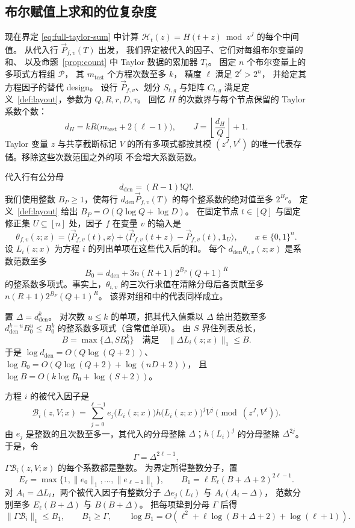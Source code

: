 \documentclass[11pt,reqno]{amsart}
\numberwithin{equation}{section}
\theoremstyle{definition}\newtheorem{definition}[theorem]{定义}
\theoremstyle{remark}\newtheorem{remark}[theorem]{注}
\renewcommand{\le}{\leqslant}
\renewcommand{\ge}{\geqslant}
\begin{document}
\subsection{布尔赋值上求和的位复杂度}
\label{subsec:rational-streaming-height}
现在界定 \eqref{eq:full-taylor-sum} 中计算
$\mathcal H_t(z)=H(t+z)\bmod z^J$ 的每个中间值。
从代入行 $\vec{P}_{f,v}(T)$ 出发，
我们界定被代入的因子、它们对每组布尔变量的和、
以及命题~\ref{prop:count} 中 Taylor 数据的累加器
$T_t$。
固定 $n$ 个布尔变量上的多项式方程组 $\mathcal P$，
其 $m_{\mathrm{test}}$ 个方程次数至多 $k$，
精度 $\ell$ 满足 $2^\ell>2^n$，
并给定其方程因子的替代 design。
设行 $\vec{P}_{f,v}$、划分 $S_{t,g}$ 与矩阵 $C_{t,g}$
满足定义~\ref{def:layout}，参数为 $Q,R,r,D,\tau$。
回忆 $H$ 的次数界与每个节点保留的 Taylor
系数个数：
\[
 d_H=kR\bigl(m_{\mathrm{test}}+2(\ell-1)\bigr),\qquad
 J=\left\lfloor\frac{d_H}{Q}\right\rfloor+1.
\]
Taylor 变量 $z$ 与共享截断标记 $V$
的所有多项式都按其模 $(z^J,V^\ell)$
的唯一代表存储。移除这些次数范围之外的项
不会增大系数范数。

代入行有公分母
\[
 d_{\mathrm{den}}=(R-1)!Q!.
\]
我们使用整数 $B_P\ge1$，使每行
$d_{\mathrm{den}}\vec{P}_{f,v}(T)$
的每个整系数的绝对值至多 $2^{B_P}$。
定义~\ref{def:layout} 给出
$B_P=O(Q\log Q+\log D)$。
在固定节点 $t\in[Q]$ 与固定修正集 $U\subseteq[n]$
处，因子 $f$ 在变量 $v$ 的输入是
\[
 \theta_{f,v}(z;x)=\langle \vec{P}_{f,v}(t), x\rangle+
       \bigl\langle \vec{P}_{f,v}(t+z)-\vec{P}_{f,v}(t),\mathbf1_U\bigr\rangle,
 \qquad x\in\{0,1\}^n.
\]
设 $L_i(z;x)$ 为方程 $i$ 的列出单项在这些代入后的和。
每个 $d_{\mathrm{den}}\theta_{i,v}(z;x)$
是系数范数至多
\[
 B_0=d_{\mathrm{den}}+3n(R+1)2^{B_P}(Q+1)^R
\]
的整系数多项式。事实上，$\theta_{i,v}$
的三次行求值在清除分母后各贡献至多
$n(R+1)2^{B_P}(Q+1)^R$。
该界对组和中的代表同样成立。

置 $\Delta=d_{\mathrm{den}}^k$。
对次数 $u\le k$ 的单项，把其代入值乘以 $\Delta$
给出范数至多 $d_{\mathrm{den}}^{k-u}B_0^u\le B_0^k$
的整系数多项式（含常值单项）。
由 $S$ 界住列表总长，
\[
 B=\max\{\Delta,SB_0^k\}
 \quad\text{满足}\quad \|\Delta L_i(z;x)\|_1\le B .
\]
于是 $\log d_{\mathrm{den}}=O(Q\log(Q+2))$、
$\log B_0=O(Q\log(Q+2)+\log(nD+2))$，
且 $\log B=O(k\log B_0+\log(S+2))$。

方程 $i$ 的被代入因子是
\[
 \mathcal B_i(z,V;x)=\sum_{j=0}^{\ell-1}
       e_j\bigl(L_i(z;x)\bigr)h\bigl(L_i(z;x)\bigr)^jV^j
       \pmod{(z^J,V^\ell)}.
\]
由 $e_j$ 是整数的且次数至多一，其代入的分母整除
$\Delta$；$h(L_i)^j$ 的分母整除 $\Delta^{2j}$。
于是，令
\[
 \Gamma=\Delta^{2\ell-1},
\]
$\Gamma\mathcal B_i(z,V;x)$ 的每个系数都是整数。
为界定所得整数分子，置
\[
 E_\ell=\max\{1,\|e_0\|_1,\ldots,\|e_{\ell-1}\|_1\},\qquad
 B_1=\ell E_\ell(B+\Delta+2)^{2\ell-1}.
\]
对 $A_i=\Delta L_i$，两个被代入因子有整数分子
$\Delta e_j(L_i)$ 与 $A_i(A_i-\Delta)$，
范数分别至多 $E_\ell(B+\Delta)$ 与 $B(B+\Delta)$。
把每项垫到分母 $\Gamma$ 后得
\[
 \|\Gamma\mathcal B_i\|_1\le B_1,\qquad B_1\ge\Gamma,
 \qquad
 \log B_1=O\!\left(\ell^2+
       \ell\log(B+\Delta+2)+\log(\ell+1)\right).
\]
\end{document}
